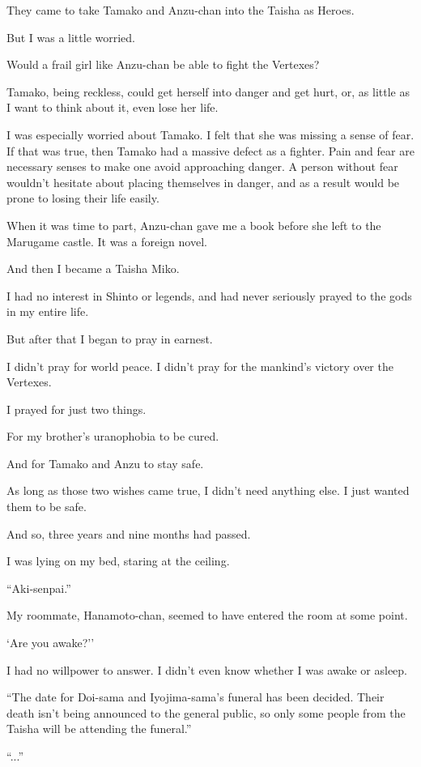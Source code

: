 They came to take Tamako and Anzu-chan into the Taisha as Heroes.

But I was a little worried.

Would a frail girl like Anzu-chan be able to fight the Vertexes?

Tamako, being reckless, could get herself into danger and get hurt, or, as little as I want to think about it, even lose her life.

I was especially worried about Tamako. I felt that she was missing a sense of fear. If that was true, then Tamako had a massive defect as a fighter. Pain and fear are necessary senses to make one avoid approaching danger. A person without fear wouldn't hesitate about placing themselves in danger, and as a result would be prone to losing their life easily.

When it was time to part, Anzu-chan gave me a book before she left to the Marugame castle. It was a foreign novel.

And then I became a Taisha Miko.

I had no interest in Shinto or legends, and had never seriously prayed to the gods in my entire life.

But after that I began to pray in earnest.

I didn't pray for world peace. I didn't pray for the mankind's victory over the Vertexes.

I prayed for just two things.

For my brother's uranophobia to be cured.

And for Tamako and Anzu to stay safe.

As long as those two wishes came true, I didn't need anything else. I just wanted them to be safe.

And so, three years and nine months had passed.

I was lying on my bed, staring at the ceiling.

``Aki-senpai.''

My roommate, Hanamoto-chan, seemed to have entered the room at some point.

`Are you awake?''

I had no willpower to answer. I didn't even know whether I was awake or asleep.

``The date for Doi-sama and Iyojima-sama's funeral has been decided. Their death isn't being announced to the general public, so only some people from the Taisha will be attending the funeral.''

``...''

